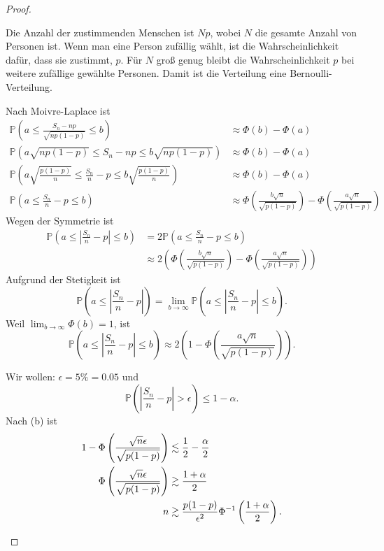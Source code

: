 \begin{proof}
	\begin{parts}
	\item Die Anzahl der zustimmenden Menschen ist $Np$, wobei $N$ die gesamte Anzahl von Personen ist. Wenn man eine Person zufällig wählt, ist die Wahrscheinlichkeit dafür, dass sie zustimmt, $p$. Für $N$ groß genug bleibt die Wahrscheinlichkeit $p$ bei weitere zufällige gewählte Personen. Damit ist die Verteilung eine Bernoulli-Verteilung. 
	\item Nach Moivre-Laplace ist
	\begin{align*}
		\mathbb{P}\left( a \le \frac{S_n - n p}{\sqrt{np(1-p)} } \le b\right) &\approx \Phi(b) - \Phi(a)\\
		\mathbb{P}\left( a\sqrt{np(1-p)}  \le S_n - np \le b\sqrt{np(1-p)} \right) &\approx \Phi(b) - \Phi(a)\\
		\mathbb{P}\left( a\sqrt{\frac{p(1-p)}{n}}  \le\frac{S_n}{n} - p \le b\sqrt{\frac{p(1-p)}{n}} \right) &\approx \Phi(b) - \Phi(a)\\
		\mathbb{P}\left( a\le\frac{S_n}{n} - p \le b \right) &\approx \Phi\left( \frac{b\sqrt{n} }{\sqrt{p(1-p)} } \right)  - \Phi\left( \frac{a\sqrt{n} }{\sqrt{p(1-p)} } \right) 
	\end{align*}
	Wegen der Symmetrie ist
	\begin{align*}
		\mathbb{P}\left( a \le \left| \frac{S_n}{n}-p \right| \le b \right) &= 2\mathbb{P}\left( a \le \frac{S_n}{n}-p\le b \right) \\
		&\approx 2\left( \Phi\left( \frac{b\sqrt{n} }{\sqrt{p(1-p)} } \right) -\Phi\left( \frac{a\sqrt{n} }{\sqrt{p(1-p)} } \right)  \right) 
	\end{align*}
	Aufgrund der Stetigkeit ist
	\[
		\mathbb{P}\left( a \le \left| \frac{S_n}{n}-p \right|  \right) =\lim_{b \to \infty} \mathbb{P}\left( a\le \left| \frac{S_n}{n}-p \right| \le b \right) 
	.\]
	Weil $\lim_{b \to \infty} \Phi(b) = 1$, ist
	\[
		\mathbb{P}\left( a \le \left| \frac{S_n}{n}-p \right| \le b \right) \approx 2\left( 1 - \Phi\left( \frac{a\sqrt{n} }{\sqrt{p(1-p)} } \right)  \right) 
	.\] 
\item Wir wollen: $\epsilon = 5\% = 0.05$ und
	\[
		\mathbb{P}\left( \left| \frac{S_n}{n}-p \right| >\epsilon \right) \le 1 - \alpha
	.\] 
	Nach (b) ist
	\begin{align*}
		1 - \Phi\left( \frac{\sqrt{n} \epsilon}{\sqrt{p(1-p)} } \right)&\lesssim \frac{1}{2}-\frac{\alpha}{2} \\
		\Phi\left( \frac{\sqrt{n} \epsilon}{\sqrt{p(1-p)} } \right) &\gtrsim \frac{1+\alpha}{2}\\
		n&\gtrsim \frac{p(1-p)}{\epsilon^2}\Phi^{-1}\left( \frac{1+\alpha}{2} \right).\qedhere
	\end{align*}
	\end{parts}
\end{proof}
